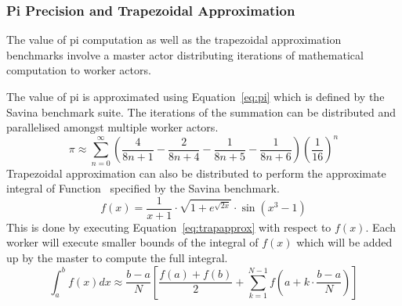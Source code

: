 \documentclass[oneside]{um-fict}
\begin{document}
\subsubsection{Pi Precision and Trapezoidal Approximation}
The value of pi computation as well as the trapezoidal approximation benchmarks involve a master actor distributing iterations of mathematical computation to worker actors.

The value of pi is approximated using Equation~\ref{eq:pi} which is defined by the Savina benchmark suite. The iterations of the summation can be distributed and parallelised amongst multiple worker actors.
\begin{equation} \label{eq:pi}
\pi\approx\sum_{n=0}^{\infty}\left(\frac{4}{8n+1}-\frac{2}{8n+4}-\frac{1}{8n+5}-\frac{1}{8n+6}\right) \left(\frac{1}{16} \right)^n
\end{equation}
Trapezoidal approximation can also be distributed to perform the approximate integral of Function~\label{eq:trapfunc} specified by the Savina benchmark.
\begin{equation} \label{eq:trapfunc}
f(x)=\frac{1}{x+1}\cdot\sqrt{1+e^{\sqrt{2x}}}\cdot \sin\left(x^3-1\right)
\end{equation}
This is done by executing Equation~\ref{eq:trapapprox} with respect to $f(x)$. Each worker will execute smaller bounds of the integral of $f(x)$ which will be added up by the master to compute the full integral.
\begin{equation} \label{eq:trapapprox}
\int_{a}^{b}f(x)dx\approx\frac{b-a}{N}\left[ \frac{f(a)+f(b)}{2}+\sum_{k=1}^{N-1}f\left( a+k\cdot\frac{b-a}{N} \right) \right]
\end{equation}
\end{document}
